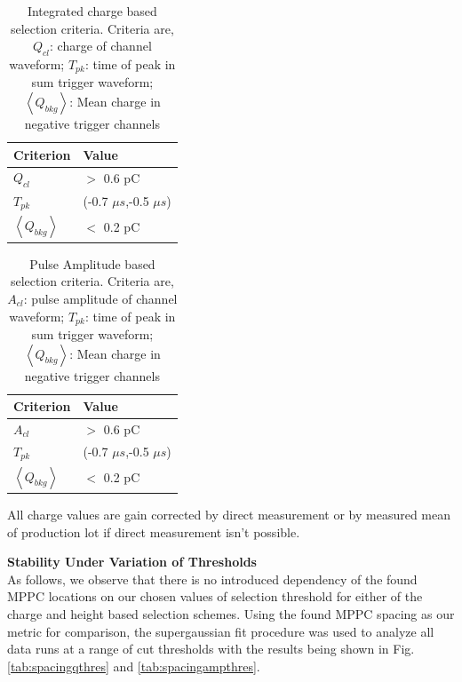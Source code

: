 \begin{table}[H]
    \caption{Integrated charge based selection criteria. Criteria are, $Q_{cl}$: charge of channel waveform; $T_{pk}$: time of peak in sum trigger waveform; $\left<Q_{bkg}\right>$: Mean charge in negative trigger channels}
    \label{tab:qselcrit}
    \centering
    \begin{tabular}{l|l}
    Criterion & Value \\
    \hline
         $Q_{cl}$ & $>$ 0.6 pC \\
         $T_{pk}$ & (-0.7 $\mu s$,-0.5 $\mu s$) \\ 
         $\left<Q_{bkg}\right>$ & $<$ 0.2 pC
    \end{tabular}
    
\end{table}
\begin{table}[H]
    \caption{Pulse Amplitude based selection criteria. Criteria are, $A_{cl}$: pulse amplitude of channel waveform; $T_{pk}$: time of peak in sum trigger waveform; $\left<Q_{bkg}\right>$: Mean charge in negative trigger channels}
    \label{tab:ampselcrit}
    \centering
    \begin{tabular}{l|l}
    Criterion & Value \\
    \hline
         $A_{cl}$ & $>$ 0.6 pC \\
         $T_{pk}$ & (-0.7 $\mu s$,-0.5 $\mu s$) \\ 
         $\left<Q_{bkg}\right>$ & $<$ 0.2 pC
    \end{tabular}
    
\end{table}

All charge values are gain corrected by direct measurement or by measured mean of production lot if direct measurement isn't possible.


\textbf{Stability Under Variation of Thresholds}\\
As follows, we observe that there is no introduced dependency of the found MPPC locations on our chosen values of selection threshold for either of the charge and height based selection schemes. Using the found MPPC spacing as our metric for comparison, the supergaussian fit procedure was used to analyze all data runs at a range of cut thresholds with the results being shown in Fig. \ref{tab:spacingqthres} and \ref{tab:spacingampthres}.

